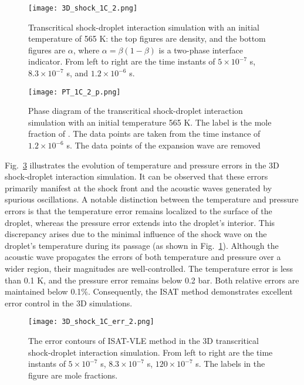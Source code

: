 \begin{figure}[htbp]
\centering
\texttt{[image: 3D\_shock\_1C\_2.png]}
\caption{Transcritical shock-droplet interaction simulation with an initial temperature of 565 K: the top figures are density, and the bottom figures are $\alpha$, where $\alpha = \beta (1-\beta)$ is a two-phase interface indicator. From left to right are the time instants of $5\times 10^{-7}$ s, $8.3\times 10^{-7}$ s, and $1.2\times 10^{-6}$ s. }
\label{droplet_3d_1C} 
\end{figure}

\begin{figure}[htbp]
\centering
\texttt{[image: PT\_1C\_2\_p.png]}
\caption{Phase diagram of the transcritical shock-droplet interaction simulation with an initial temperature 565 K. The label is the mole fraction of . The data points are taken from the time instance of $1.2\times 10^{-6}$ s. The data points of the expansion wave are removed}
\label{droplet_3D_1C_phasediagram} 
\end{figure}

Fig.~\ref{SD_3D_err} illustrates the evolution of temperature and pressure errors in the 3D shock-droplet interaction simulation. It can be observed that these errors primarily manifest at the shock front and the acoustic waves generated by spurious oscillations. A notable distinction between the temperature and pressure errors is that the temperature error remains localized to the surface of the droplet, whereas the pressure error extends into the droplet's interior. This discrepancy arises due to the minimal influence of the shock wave on the droplet's temperature during its passage (as shown in Fig.~\ref{droplet_3d_1C}). Although the acoustic wave propagates the errors of both temperature and pressure over a wider region, their magnitudes are well-controlled. The temperature error is less than 0.1 K, and the pressure error remains below 0.2 bar. Both relative errors are maintained below 0.1\%. Consequently, the ISAT method demonstrates excellent error control in the 3D simulations.



\begin{figure}[htbp]
\centering
\texttt{[image: 3D\_shock\_1C\_err\_2.png]}
\caption{The error contours of ISAT-VLE method in the 3D transcritical shock-droplet interaction simulation. From left to right are the time instants of $5\times 10^{-7}$ s, $8.3\times 10^{-7}$ s, $120\times 10^{-7}$ s. The labels in the figure are mole fractions.}
\label{SD_3D_err} 
\end{figure}

